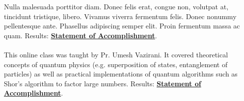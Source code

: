 \documentclass[theme]{si_template/en_cv}
\begin{document}
\begin{paracol}{2}
\begin{leftcolumn*}
{{\begin{minipage}[l]{0.9\leftcolwidth}
                \end{minipage}
            }%
        } %
        \end{leftcolumn*}
        \begin{rightcolumn}\noindent \small
            \hspace{-2.4pt}
            {Nulla malesuada porttitor diam. Donec felis erat, congue non, volutpat at, tincidunt tristique, libero. Vivamus viverra fermentum felis. Donec nonummy pellentesque ante. Phasellus adipiscing semper elit. Proin fermentum massa ac quam.}
            {Results: \href{http://example.com}{\textbf{Statement of Accomplishment}}.
            }\\
            \vspace{\itemspace}\\
            {This online class was taught by Pr. Umesh Vazirani. It covered theoretical concepts of quantum physics (e.g. superposition of states, entanglement of particles) as well as practical implementations of quantum algorithms such as Shor's algorithm to factor large numbers.}
            {Results: \href{http://example.com}{\textbf{Statement of Accomplishment}}.}


\end{rightcolumn}
\end{paracol}
\end{document}
